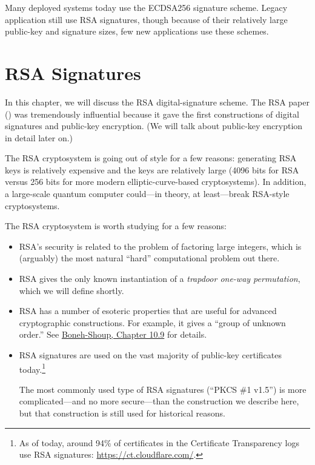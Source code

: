 \documentclass[
  letterpaper,
]{scrbook}
\theoremstyle{definition}
\theoremstyle{plain}
\theoremstyle{plain}
\theoremstyle{remark}
\begin{document}
Many deployed systems today use the ECDSA256 signature scheme. Legacy
application still use RSA signatures, though because of their relatively
large public-key and signature sizes, few new applications use these
schemes.


\chapter{RSA Signatures}\label{sec-rsa}

In this chapter, we will discuss the RSA digital-signature scheme. The
RSA paper () was tremendously
influential because it gave the first constructions of digital
signatures and public-key encryption. (We will talk about public-key
encryption in detail later on.)

The RSA cryptosystem is going out of style for a few reasons: generating
RSA keys is relatively expensive and the keys are relatively large (4096
bits for RSA versus 256 bits for more modern elliptic-curve-based
cryptosystems). In addition, a large-scale quantum computer could---in
theory, at least---break RSA-style cryptosystems.

The RSA cryptosystem is worth studying for a few reasons:

\begin{itemize}
\item
  RSA's security is related to the problem of factoring large integers,
  which is (arguably) the most natural ``hard'' computational problem
  out there.
\item
  RSA gives the only known instantiation of a \emph{trapdoor one-way
  permutation}, which we will define shortly.
\item
  RSA has a number of esoteric properties that are useful for advanced
  cryptographic constructions. For example, it gives a ``group of
  unknown order.'' See
  \href{https://toc.cryptobook.us/book.pdf\#page=436}{Boneh-Shoup,
  Chapter 10.9} for details.
\item
  RSA signatures are used on the vast majority of public-key
  certificates today.\footnote{As of today, around 94\% of certificates
    in the Certificate Transparency logs use RSA signatures:
    \url{https://ct.cloudflare.com/}.}

  The most commonly used type of RSA signatures (``PKCS \#1 v1.5'') is
  more complicated---and no more secure---than the construction we
  describe here, but that construction is still used for historical
  reasons.
\end{itemize}
\end{document}
